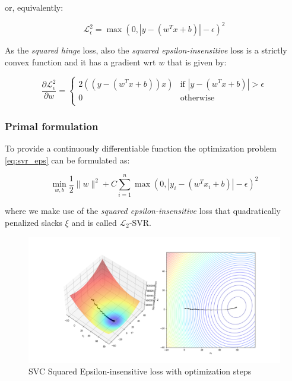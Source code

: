or, equivalently:

\begin{equation} \label{eq:squared_eps_loss2}
	\mathcal{L}_\epsilon^2 = \max(0, |y - (w^T x + b)| - \epsilon)^2
\end{equation}

As the \emph{squared hinge} loss, also the \emph{squared epsilon-insensitive} loss is a strictly convex function and it has a gradient wrt $w$ that is given by:

\begin{equation} \label{eq:squared_eps_loss_der}
	\frac{\partial \mathcal{L}_\epsilon^2}{\partial w}=
		\begin{cases}
            2 ((y - (w^T x + b)) x) & \text{if } |y - (w^T x + b)| > \epsilon \\
            0 & \text{otherwise} \\ 
        \end{cases}
\end{equation}

\subsubsection{Primal formulation}

To provide a continuously differentiable function the optimization problem \ref{eq:svr_eps} can be formulated as: 

\begin{equation} \label{eq:svr_squared_eps}
    \min_{w,b} \frac{1}{2} \| w \|^2 + C \sum_{i=1}^n \max(0, |y_i - (w^T x_i + b)| - \epsilon)^2
\end{equation}

where we make use of the \emph{squared epsilon-insensitive} loss that quadratically penalized slacks $\xi$ and is called $\mathcal{L}_2$-SVR.

\begin{figure}[h!]
	\centering
  	\includegraphics[scale=0.4]{img/svr_squared_eps_loss.png}
  	\caption{SVC Squared Epsilon-insensitive loss with optimization steps}
  	\label{fig:svr_squared_eps_loss}
\end{figure}
